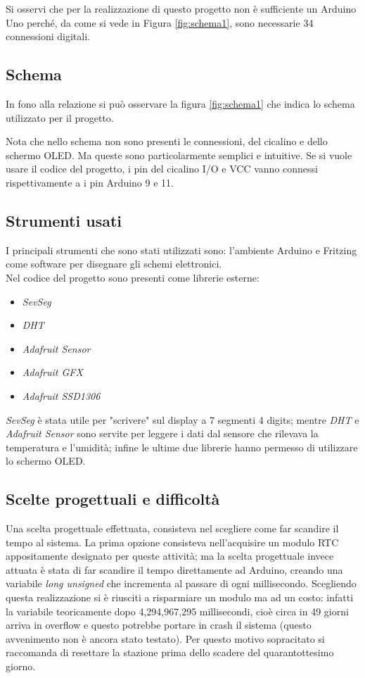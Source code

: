 \documentclass[paper=a4, fontsize=10pt]{scrartcl}
\begin{document}
Si osservi che per la realizzazione di questo progetto non è sufficiente un Arduino Uno perché, da come si vede in Figura \ref{fig:schema1}, sono necessarie 34 connessioni digitali.
\subsection{Schema}
In fono alla relazione si può osservare la figura \ref{fig:schema1} che indica lo schema utilizzato per il progetto.

Nota che nello schema non sono presenti le connessioni, del cicalino e dello schermo OLED. Ma queste sono particolarmente semplici e intuitive. Se si vuole usare il codice del progetto, i pin del cicalino I/O e VCC vanno connessi rispettivamente a i pin Arduino 9 e 11.


\subsection{Strumenti usati}
I principali strumenti che sono stati utilizzati sono: l'ambiente Arduino e Fritzing come software per disegnare gli schemi elettronici.\\
Nel codice del progetto sono presenti come librerie esterne:
\begin{itemize}
\item \textit{SevSeg}
\item \textit{DHT}
\item \textit{Adafruit Sensor}
\item \textit{Adafruit GFX}
\item \textit{Adafruit SSD1306}
\end{itemize}

\textit{SevSeg} è stata utile per "scrivere" sul display a 7 segmenti 4 digits; mentre \textit{DHT} e \textit{Adafruit Sensor} sono servite per leggere i dati dal sensore che rilevava la temperatura e l'umidità; infine  le ultime due librerie hanno permesso di utilizzare lo schermo OLED. 


\subsection{Scelte progettuali e difficoltà}
Una scelta progettuale effettuata, consisteva nel scegliere come far scandire il tempo al sistema.
La prima opzione consisteva nell'acquisire un modulo RTC appositamente designato per queste attività; ma la scelta progettuale invece attuata è stata di far scandire il tempo direttamente ad Arduino, creando una variabile \textit{long unsigned} che incrementa al passare di ogni millisecondo. Scegliendo questa realizzazione si è riusciti a risparmiare un modulo ma ad un costo: infatti la variabile teoricamente dopo 4,294,967,295 millisecondi, cioè circa in 49 giorni arriva in overflow e questo potrebbe portare in crash il sistema (questo avvenimento non è ancora stato testato). Per questo motivo sopracitato si raccomanda di resettare la stazione prima dello scadere del quarantottesimo giorno.
\end{document}
